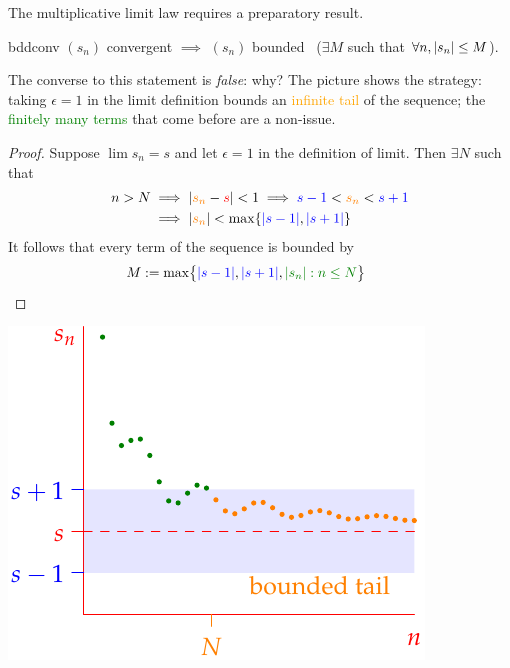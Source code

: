 \vfil

The multiplicative limit law requires a preparatory result.

\begin{lemm}{}{bddconv}
	$(s_n)$ convergent $\implies$ $(s_n)$ bounded \ ($\exists M$ such that $\forall n, \left| s_n\right|\le M$).
\end{lemm}

\begin{minipage}[t]{0.6\linewidth}\vspace{-5pt}
	The converse to this statement is \emph{false}: why?\smallbreak
	The picture shows the strategy: taking $\epsilon=1$ in the limit definition bounds an \textcolor{orange}{infinite tail} of the sequence; the \textcolor{Green}{finitely many terms} that come before are a non-issue.
	
	\begin{proof}
		Suppose $\lim s_n=s$ and let $\epsilon=1$ in the definition of
		limit. Then $\exists N$ such that
		\begin{align*}
		n>N&\implies \left| \textcolor{orange}{s_n}-\textcolor{red}{s}\right|<1 \implies \textcolor{blue}{s-1}<\textcolor{orange}{s_n}<\textcolor{blue}{s+1}\\
		&\implies \left| \textcolor{orange}{s_n}\right|<\max\{\textcolor{blue}{\left| s-1\right|},\textcolor{blue}{\left| s+1\right|}\}
		\end{align*}
		It follows that every term of the sequence is bounded by
		\[M:=\max\bigl\{\textcolor{blue}{\nm{s-1}},\textcolor{blue}{\nm{s+1}},\textcolor{Green}{\nm{s_n}:n\le N}\bigr\}\tag*{\phantom\qedhere}\]
	\end{proof}
\end{minipage}\hfill\begin{minipage}[t]{0.39\linewidth}\vspace{0pt}
	\flushright\includegraphics[scale=0.92]{convbdd}\par
	\vspace{12pt}
	\hfill\qedsymbol
\end{minipage}
\bigbreak

